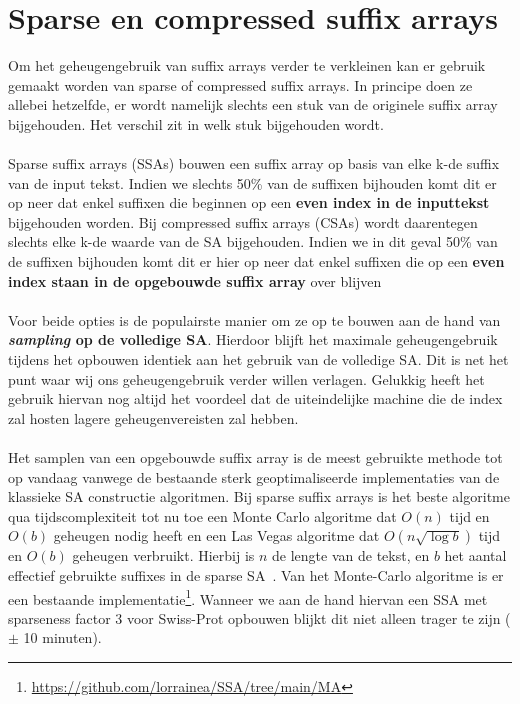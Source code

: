 \section{Sparse en compressed suffix arrays}\label{sec:sparse-en-compressed-suffix-arrays}
Om het geheugengebruik van suffix arrays verder te verkleinen kan er gebruik gemaakt worden van sparse of compressed suffix arrays.
In principe doen ze allebei hetzelfde, er wordt namelijk slechts een stuk van de originele suffix array bijgehouden.
Het verschil zit in welk stuk bijgehouden wordt.
\\ \\
Sparse suffix arrays (SSAs) bouwen een suffix array op basis van elke k-de suffix van de input tekst.
Indien we slechts 50\% van de suffixen bijhouden komt dit er op neer dat enkel suffixen die beginnen op een \textbf{even index in de inputtekst} bijgehouden worden.
Bij compressed suffix arrays (CSAs) wordt daarentegen slechts elke k-de waarde van de SA bijgehouden.
Indien we in dit geval 50\% van de suffixen bijhouden komt dit er hier op neer dat enkel suffixen die op een \textbf{even index staan in de opgebouwde suffix array} over blijven
\\ \\
Voor beide opties is de populairste manier om ze op te bouwen aan de hand van \textbf{\textit{sampling} op de volledige SA\@}.
Hierdoor blijft het maximale geheugengebruik tijdens het opbouwen identiek aan het gebruik van de volledige SA\@.
Dit is net het punt waar wij ons geheugengebruik verder willen verlagen.
Gelukkig heeft het gebruik hiervan nog altijd het voordeel dat de uiteindelijke machine die de index zal hosten lagere geheugenvereisten zal hebben.
\\ \\
Het samplen van een opgebouwde suffix array is de meest gebruikte methode tot op vandaag vanwege de bestaande sterk geoptimaliseerde implementaties van de klassieke SA constructie algoritmen.
Bij sparse suffix arrays is het beste algoritme qua tijdscomplexiteit tot nu toe een Monte Carlo algoritme dat $O(n)$ tijd en $O(b)$ geheugen nodig heeft en een Las Vegas algoritme dat $O(n \sqrt{\log b})$ tijd en $O(b)$ geheugen verbruikt.
Hierbij is $n$ de lengte van de tekst, en $b$ het aantal effectief gebruikte suffixes in de sparse SA~\cite{building_sparse_sa}.
Van het Monte-Carlo algoritme is er een bestaande implementatie\footnote{\url{https://github.com/lorrainea/SSA/tree/main/MA}}.
Wanneer we aan de hand hiervan een SSA met sparseness factor 3 voor Swiss-Prot opbouwen blijkt dit niet alleen trager te zijn ($\pm$ 10 minuten).
